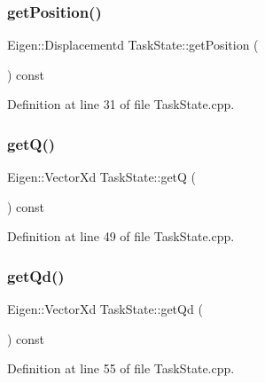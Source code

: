 \subsubsection{\texorpdfstring{get\+Position()}{getPosition()}}
{\footnotesize\ttfamily Eigen\+::\+Displacementd Task\+State\+::get\+Position (\begin{DoxyParamCaption}{ }\end{DoxyParamCaption}) const}



Definition at line 31 of file Task\+State.\+cpp.

\hypertarget{classocra_1_1TaskState_ab878584c1e0f3fe512006f7ade4d03fe}{}\label{classocra_1_1TaskState_ab878584c1e0f3fe512006f7ade4d03fe} 
\subsubsection{\texorpdfstring{get\+Q()}{getQ()}}
{\footnotesize\ttfamily Eigen\+::\+Vector\+Xd Task\+State\+::getQ (\begin{DoxyParamCaption}{ }\end{DoxyParamCaption}) const}



Definition at line 49 of file Task\+State.\+cpp.

\hypertarget{classocra_1_1TaskState_a18507d702b5442c2de22b48db795e46d}{}\label{classocra_1_1TaskState_a18507d702b5442c2de22b48db795e46d} 
\subsubsection{\texorpdfstring{get\+Qd()}{getQd()}}
{\footnotesize\ttfamily Eigen\+::\+Vector\+Xd Task\+State\+::get\+Qd (\begin{DoxyParamCaption}{ }\end{DoxyParamCaption}) const}



Definition at line 55 of file Task\+State.\+cpp.

\hypertarget{classocra_1_1TaskState_ae44110907bda20468f2d1b5416ce347f}{}\label{classocra_1_1TaskState_ae44110907bda20468f2d1b5416ce347f} 
